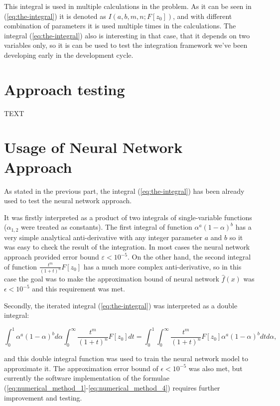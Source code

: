 \documentclass[%
]{ittmm}
\begin{document}
\noindent This integral is used in multiple calculations in the problem. As it can be seen in (\ref{eq:the-integral}) it is denoted as $I(a, b, m, n; F[z_{0}])$, and with different combination of parameters it is used multiple times in the calculations. The integral (\ref{eq:the-integral}) also is interesting in that case, that it depends on two variables only, so it is can be used to test the integration framework we've been developing early in the development cycle. 

\section{Approach testing}

TEXT

\section{Usage of Neural Network Approach}

As stated in the previous part, the integral (\ref{eq:the-integral}) has been already used to test the neural network approach. 

It was firstly interpreted as a product of two integrals of single-variable functions ($\alpha_{1,2}$ were treated as constants). The first integral of function $\alpha^{a}(1 - \alpha)^b$ has a very simple analytical anti-derivative with any integer parameter $a$ and $b$ so it was easy to check the result of the integration. In most cases the neural network approach provided error bound $\varepsilon < 10^{-5}$. On the other hand, the second integral of function $\frac{t^m}{(1+t)^n}F[z_{0}]$ has a much more complex anti-derivative, so in this case the goal was to make the approximation bound of neural network $\hat{f}(x)$ was $\epsilon < 10^{-5}$ and this requirement was met.

Secondly, the iterated integral (\ref{eq:the-integral}) was interpreted as a double integral:

\begin{equation}
    \label{eq:iterated-as-double}
     \int_{0}^{1} \alpha^{a}(1 - \alpha)^bd\alpha \int_{0}^{\infty}\frac{t^m}{(1+t)^n}F[z_{0}]dt = 
     \int_{0}^{1} \int_{0}^{\infty}\frac{t^m}{(1+t)^n}F[z_{0}]\alpha^{a}(1 - \alpha)^bdtd\alpha ,
\end{equation}

\noindent and this double integral function was used to train the neural network model to approximate it. The approximation error bound of $\epsilon < 10^{-5}$ was also met, but currently the software implementation of the formulae (\ref{eq:numerical_method_1}-\ref{eq:numerical_method_4}) requires further improvement and testing.
\end{document}
